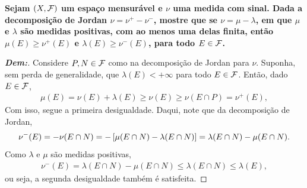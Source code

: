 \localtableofcontents
{}

\bigline
\textbf{Sejam $(X, \mathcal F)$ um espaço mensurável e $\nu$ uma medida com sinal. Dada 
a decomposição de Jordan $\nu = \nu^+ - \nu^-$, mostre que se $\nu = \mu -\lambda$, em que 
$\mu$ e $\lambda$ são medidas positivas, com ao menos uma delas finita, então $\mu(E) \ge \nu^+(E)$
e $\lambda(E) \ge \nu^-(E)$, para todo $E \in \mathcal F$.}
\begin{proof}[\textbf{Dem:}] Considere $P, N \in \mathcal F$ como na decomposição de Jordan
  para $\nu$.
Suponha, sem perda de generalidade, que $\lambda(E) < +\infty$ 
para todo $E \in \mathcal F$. Então, dado $E \in \mathcal F$,
\begin{align*}
  \mu(E) = \nu(E) + \lambda(E) \ge \nu(E) \ge \nu(E\cap P) = \nu^+(E),
\end{align*}
Com isso, segue a primeira desigualdade. Daqui, note que da decomposição 
de Jordan,
\begin{align*}
  \nu^-(E) = -\nu(E\cap N) = - \left[\mu(E \cap N) - \lambda(E \cap N)\right] 
  = \lambda(E \cap N) - \mu(E \cap N).
\end{align*}
Como $\lambda$ e $\mu$ são medidas positivas, 
\begin{align*}
  \nu^-(E) = \lambda(E\cap N) - \mu(E\cap N) \le \lambda(E\cap N) \le \lambda(E),
\end{align*}
ou seja, a segunda desigualdade também é satisfeita.
\end{proof}

\textbf{}

